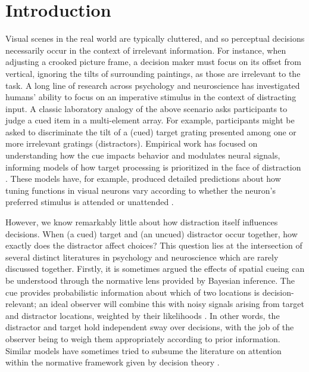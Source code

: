 \documentclass[a4paper, nobind]{templates/ociamthesis}
\begin{document}
\hypertarget{introduction-2}{%
\section{Introduction}\label{introduction-2}}

Visual scenes in the real world are typically cluttered, and so perceptual decisions necessarily occur in the context of irrelevant information. For instance, when adjusting a crooked picture frame, a decision maker must focus on its offset from vertical, ignoring the tilts of surrounding paintings, as those are irrelevant to the task. A long line of research across psychology and neuroscience has investigated humans' ability to focus on an imperative stimulus in the context of distracting input. A classic laboratory analogy of the above scenario asks participants to judge a cued item in a multi-element array. For example, participants might be asked to discriminate the tilt of a (cued) target grating presented among one or more irrelevant gratings (distractors). Empirical work has focused on understanding how the cue impacts behavior and modulates neural signals, informing models of how target processing is prioritized in the face of distraction \autocite{reynolds2004,carrasco2011}. These models have, for example, produced detailed predictions about how tuning functions in visual neurons vary according to whether the neuron's preferred stimulus is attended or unattended \autocite{moran1985,mcadams1999,treue1999,reynolds2009}.

However, we know remarkably little about how distraction itself influences decisions. When (a cued) target and (an uncued) distractor occur together, how exactly does the distractor affect choices? This question lies at the intersection of several distinct literatures in psychology and neuroscience which are rarely discussed together. Firstly, it is sometimes argued the effects of spatial cueing can be understood through the normative lens provided by Bayesian inference. The cue provides probabilistic information about which of two locations is decision-relevant; an ideal observer will combine this with noisy signals arising from target and distractor locations, weighted by their likelihoods \autocites[according to the probabilistic cue,][]{dayan1999,eckstein2009}. In other words, the distractor and target hold independent sway over decisions, with the job of the observer being to weigh them appropriately according to prior information. Similar models have sometimes tried to subsume the literature on attention within the normative framework given by decision theory \autocite{anderson2011}.
\end{document}
